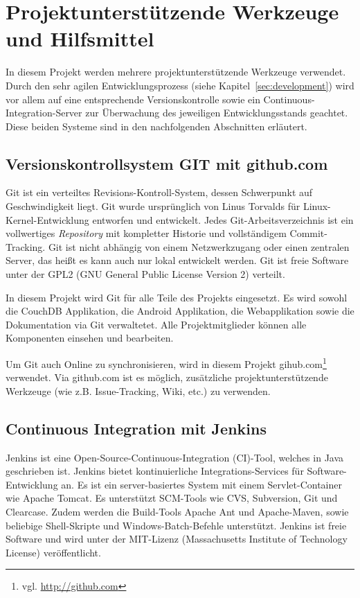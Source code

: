\section{Projektunterstützende Werkzeuge und Hilfsmittel}
\label{sec:tools}

In diesem Projekt werden mehrere projektunterstützende Werkzeuge verwendet.
	Durch den sehr agilen Entwicklungsprozess (siehe Kapitel~\ref{sec:development})
	wird vor allem auf eine entsprechende Versionskontrolle sowie ein
	Continuous-Integration-Server zur Überwachung des jeweiligen Entwicklungsstands
	geachtet. Diese beiden Systeme sind in den nachfolgenden Abschnitten erläutert.

\subsection{Versionskontrollsystem GIT mit github.com}
\label{subsec:git}

Git ist ein verteiltes Revisions-Kontroll-System, dessen Schwerpunkt auf
	Geschwindigkeit liegt. Git wurde ursprünglich von Linus Torvalds für
	Linux-Kernel-Entwicklung \cite{Torvalds07} entworfen und entwickelt.
	Jedes Git-Arbeitsverzeichnis ist ein vollwertiges \emph{Repository} mit
	kompletter Historie und vollständigem Commit-Tracking.
	Git ist nicht abhängig von einem Netzwerkzugang oder einen zentralen
	Server, das heißt es kann auch nur lokal entwickelt werden.
	Git ist freie Software unter der GPL2 (GNU General Public License
	Version 2) verteilt.
	
In diesem Projekt wird Git für alle Teile des Projekts eingesetzt. Es wird sowohl
	die CouchDB Applikation, die Android Applikation, die Webapplikation sowie die
	Dokumentation via Git verwaltetet. Alle Projektmitglieder können alle
	Komponenten einsehen und bearbeiten.
	
Um Git auch Online zu synchronisieren, wird in diesem Projekt
	gihub.com\footnote{vgl. \url{http://github.com}} verwendet. Via github.com ist es
	möglich, zusätzliche projektunterstützende Werkzeuge (wie z.B. Issue-Tracking,
	Wiki, etc.) zu verwenden.

\subsection{Continuous Integration mit Jenkins}
\label{subsec:ci}

Jenkins ist eine Open-Source-Continuous-Integration (CI)-Tool, welches in Java
	geschrieben ist. Jenkins bietet kontinuierliche Integrations-Services für
	Software-Entwicklung an. Es ist ein server-basiertes System
	mit einem Servlet-Container wie Apache Tomcat. Es unterstützt SCM-Tools
	wie CVS, Subversion, Git und Clearcase. Zudem werden die Build-Tools
	Apache Ant und Apache-Maven, sowie beliebige Shell-Skripte und
	Windows-Batch-Befehle unterstützt. Jenkins ist freie Software und wird
	unter der MIT-Lizenz (Massachusetts Institute of Technology License) veröffentlicht.
	
